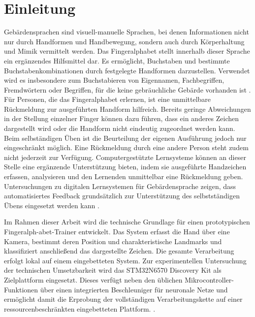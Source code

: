 \chapter{Einleitung}\label{ch:einleitung}

Gebärdensprachen sind visuell-manuelle Sprachen, bei denen Informationen nicht nur durch Handformen und Handbewegung, sondern auch durch Körperhaltung und Mimik vermittelt werden. Das Fingeralphabet stellt innerhalb dieser Sprache ein ergänzendes Hilfsmittel dar. Es ermöglicht, Buchstaben und bestimmte Buchstabenkombinationen durch festgelegte \linebreak Handformen darzustellen. Verwendet wird es insbesondere zum Buchstabieren von Eigennamen, Fachbegriffen, Fremdwörtern oder Begriffen, für die keine gebräuchliche Gebärde vorhanden ist \cite{aktion-mensch, DeutscheGebaerdensprache}. Für Personen, die das Fingeralphabet erlernen, ist eine unmittelbare Rückmeldung zur ausgeführten Handform hilfreich. Bereits geringe Abweichungen in der Stellung einzelner Finger können dazu führen, dass ein anderes Zeichen dargestellt wird oder die Handform nicht eindeutig zugeordnet werden kann. Beim selbständigen Üben ist die Beurteilung der eigenen Ausführung jedoch nur eingeschränkt möglich. Eine Rückmeldung durch eine andere Person steht zudem nicht jederzeit zur Verfügung. Computergestützte Lernsysteme können an dieser Stelle eine ergänzende Unterstützung bieten, indem sie ausgeführte Handzeichen erfassen, analysieren und den Lernenden unmittelbar eine Rückmeldung geben. Untersuchungen zu digitalen Lernsystemen für Gebärdensprache zeigen, dass automatisiertes Feedback grundsätzlich zur Unterstützung des selbstständigen Übens eingesetzt werden kann \cite[S. 1]{huenerfauthEvaluationLanguageFeedback2017}.

Im Rahmen dieser Arbeit wird die technische Grundlage für einen prototypischen Fingeralph-abet-Trainer entwickelt. Das System erfasst die Hand über eine Kamera, bestimmt deren Position und charakteristische Landmarks und klassifiziert anschließend das dargestellte Zeichen. Die gesamte Verarbeitung erfolgt lokal auf einem eingebetteten System. Zur experimentellen Untersuchung der technischen Umsetzbarkeit wird das STM32N6570 Discovery Kit als Zielplattform eingesetzt. Dieses verfügt neben den üblichen Mikrocontroller-Funktionen über einen integrierten Beschleuniger für neuronale Netze und ermöglicht damit die Erprobung der vollständigen Verarbeitungskette auf einer ressourcenbeschränkten eingebetteten Plattform. \cite{STM32N6570DKProductSTMicroelectronics}.

